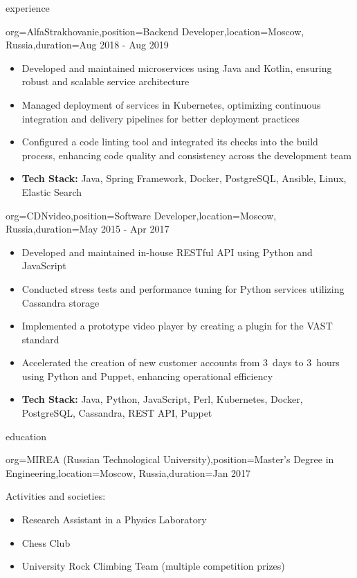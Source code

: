 \documentclass{resume}
\begin{document}
\begin{ResumeSection}{experience}
    \begin{ResumeSubsection}{org=AlfaStrakhovanie,position=Backend Developer,location={Moscow, Russia},duration=Aug 2018 - Aug 2019}
        \begin{itemize}
            \item Developed and maintained microservices using Java and Kotlin, ensuring robust and scalable service architecture
            \item Managed deployment of services in Kubernetes, optimizing continuous integration and delivery pipelines for better deployment practices
            \item Configured a code linting tool and integrated its checks into the build process, enhancing code quality and consistency across the development team
            \item \textbf{Tech Stack:} Java, Spring Framework, Docker, PostgreSQL, Ansible, Linux, Elastic Search
        \end{itemize}
    \end{ResumeSubsection}

    \begin{ResumeSubsection}{org=CDNvideo,position=Software Developer,location={Moscow, Russia},duration=May 2015 - Apr 2017}
        \begin{itemize}
            \item Developed and maintained in-house RESTful API using Python and JavaScript
            \item Conducted stress tests and performance tuning for Python services utilizing Cassandra storage
            \item Implemented a prototype video player by creating a plugin for the VAST standard
            \item Accelerated the creation of new customer accounts from 3~days to 3~hours using Python and Puppet, enhancing operational efficiency
            \item \textbf{Tech Stack:} Java, Python, JavaScript, Perl, Kubernetes, Docker, PostgreSQL, Cassandra, REST API, Puppet
        \end{itemize}
    \end{ResumeSubsection}
\end{ResumeSection}

\begin{ResumeSection}{education}
    \begin{ResumeSubsection}{org={MIREA (Russian Technological University)},position={Master's Degree in Engineering},location={Moscow, Russia},duration=Jan 2017}
        
        \medskip
        Activities and societies:
        \begin{itemize}
            \item Research Assistant in a Physics Laboratory
            \item Chess Club
            \item University Rock Climbing Team (multiple competition prizes)
        \end{itemize}
    \end{ResumeSubsection}
\end{ResumeSection}
\end{document}
